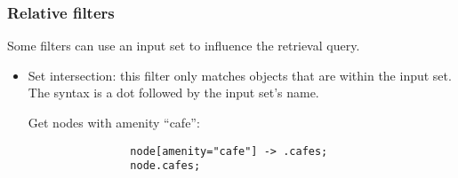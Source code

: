 \documentclass[main.tex]{subfiles}
\begin{document}
\subsubsection{Relative filters}
Some filters can use an input set to influence the retrieval query.
\begin{itemize}
    \item Set intersection: this filter only matches objects that are within
        the input set. The syntax is a dot followed by the input set's name.
        \begin{example}
            Get nodes with amenity ``cafe'':
            \begin{lstwrap}\begin{lstlisting}
                node[amenity="cafe"] -> .cafes;
                node.cafes;
            \end{lstlisting}\end{lstwrap}


\end{example}
\end{itemize}
\end{document}
